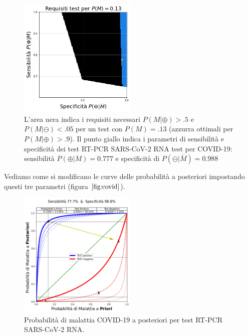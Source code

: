 \documentclass[11pt]{article}
\begin{document}
    
        \begin{figure}
        \centering
            \includegraphics[width=0.5\textwidth,height=0.5\textheight,keepaspectratio]{requisiti13.png}
            \caption{L'area nera indica i requisiti necessari $P(M|\oplus)>.5$ e $P(M|\ominus)<.05$ per un test con $P(M)=.13$ (azzurra ottimali per $P(M|\oplus)>.9$). Il punto giallo indica i parametri di sensibilità e specificità dei test RT-PCR SARS-CoV-2 RNA test per COVID-19: sensibilità $P(\oplus|M)=0.777$ e specificità di $P(\ominus|\overline{M})=0.988$}
            \label{fig:requisiti13}
        \end{figure}

    
    Vediamo come si modificano le curve delle probabilità a posteriori
impostando questi tre parametri (figura \(\ref{fig:covid}\)).

    
        \begin{figure}
        \centering
            \includegraphics[width=0.5\textwidth,height=0.5\textheight,keepaspectratio]{covid.png}
            \caption{Probabilità di malattia COVID-19 a posteriori per test RT-PCR SARS-CoV-2 RNA.}
            \label{fig:covid}
        \end{figure}
\end{document}
